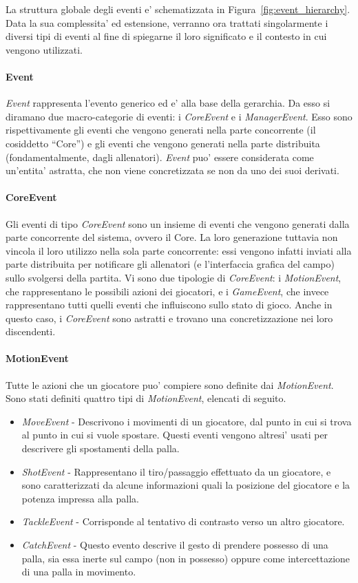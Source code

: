 La struttura globale degli eventi e' schematizzata in Figura~\ref{fig:event_hierarchy}. Data la sua complessita' ed estensione, verranno ora trattati singolarmente i diversi tipi di eventi al fine di spiegarne il loro significato e il contesto in cui vengono utilizzati.

\paragraph{Event} \textit{Event} rappresenta l'evento generico ed e' alla base della gerarchia. Da esso si diramano due macro-categorie di eventi: i \textit{CoreEvent} e i \textit{ManagerEvent}. Esso sono rispettivamente gli eventi che vengono generati nella parte concorrente (il cosiddetto ``Core'') e gli eventi che vengono generati nella parte distribuita (fondamentalmente, dagli allenatori). \textit{Event} puo' essere considerata come un'entita' astratta, che non viene concretizzata se non da uno dei suoi derivati.

\paragraph{CoreEvent} Gli eventi di tipo \textit{CoreEvent} sono un insieme di eventi che vengono generati dalla parte concorrente del sistema, ovvero il Core. La loro generazione tuttavia non vincola il loro utilizzo nella sola parte concorrente: essi vengono infatti inviati alla parte distribuita per notificare gli allenatori (e l'interfaccia grafica del campo) sullo svolgersi della partita. Vi sono due tipologie di \textit{CoreEvent}: i \textit{MotionEvent}, che rappresentano le possibili azioni dei giocatori, e i \textit{GameEvent}, che invece rappresentano tutti quelli eventi che influiscono sullo stato di gioco. Anche in questo caso, i \textit{CoreEvent} sono astratti e trovano una concretizzazione nei loro discendenti.

\paragraph{MotionEvent} Tutte le azioni che un giocatore puo' compiere sono definite dai \textit{MotionEvent}. Sono stati definiti quattro tipi di \textit{MotionEvent}, elencati di seguito.

\begin{itemize}
	\item \textit{MoveEvent} - Descrivono i movimenti di un giocatore, dal punto in cui si trova al punto in cui si vuole spostare. Questi eventi vengono altresi' usati per descrivere gli spostamenti della palla.
	\item \textit{ShotEvent} - Rappresentano il tiro/passaggio effettuato da un giocatore, e sono caratterizzati da alcune informazioni quali la posizione del giocatore e la potenza impressa alla palla.
	\item \textit{TackleEvent} - Corrisponde al tentativo di contrasto verso un altro giocatore.
	\item \textit{CatchEvent} - Questo evento descrive il gesto di prendere possesso di una palla, sia essa inerte sul campo (non in possesso) oppure come intercettazione di una palla in movimento.
\end{itemize}


